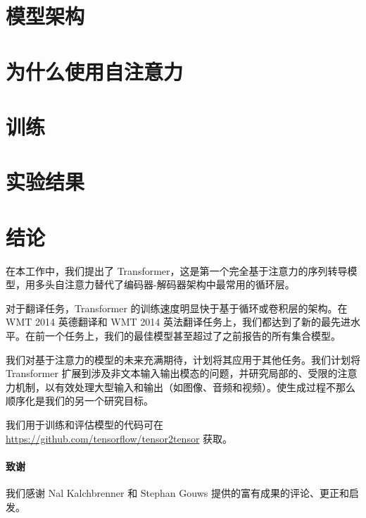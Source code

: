 \documentclass{article}
\begin{document}


\section{模型架构}

 
\section{为什么使用自注意力}


\section{训练}

 
\section{实验结果} \label{sec:results}


\section{结论}
在本工作中，我们提出了 Transformer，这是第一个完全基于注意力的序列转导模型，用多头自注意力替代了编码器-解码器架构中最常用的循环层。

对于翻译任务，Transformer 的训练速度明显快于基于循环或卷积层的架构。在 WMT 2014 英德翻译和 WMT 2014 英法翻译任务上，我们都达到了新的最先进水平。在前一个任务上，我们的最佳模型甚至超过了之前报告的所有集合模型。

我们对基于注意力的模型的未来充满期待，计划将其应用于其他任务。我们计划将 Transformer 扩展到涉及非文本输入输出模态的问题，并研究局部的、受限的注意力机制，以有效处理大型输入和输出（如图像、音频和视频）。使生成过程不那么顺序化是我们的另一个研究目标。

我们用于训练和评估模型的代码可在 \url{https://github.com/tensorflow/tensor2tensor} 获取。

\paragraph{致谢} 我们感谢 Nal Kalchbrenner 和 Stephan Gouws 提供的富有成果的评论、更正和启发。
\end{document}
